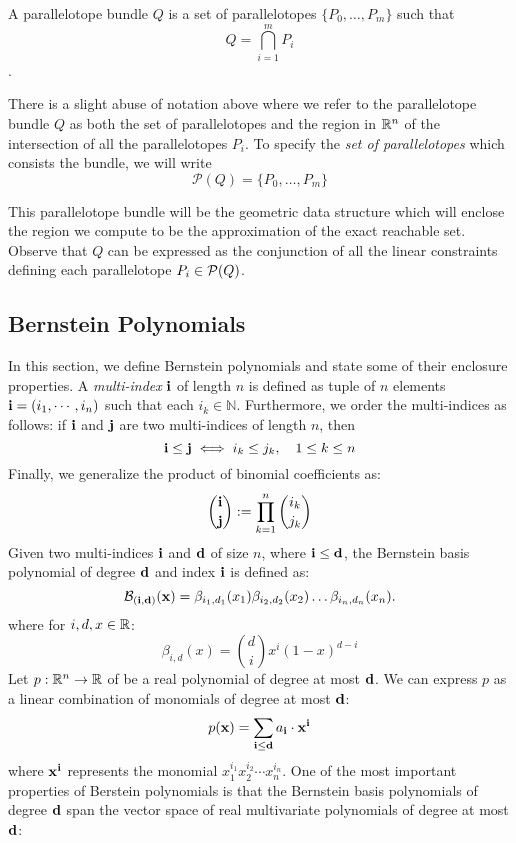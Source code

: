 %
%
\begin{definition}
A parallelotope bundle $Q$ is a set of parallelotopes $\{P_0, \ldots, P_m\}$ such that
  $$ Q = \bigcap_{i=1}^{m}P_i $$.
\end{definition}

\begin{remark}
There is a slight abuse of notation above where we refer to the parallelotope bundle $Q$ as both the set of parallelotopes and the region in ${\mathbb{R}}^n$ of the intersection of all the parallelotopes $P_i$. To specify the \emph{set of parallelotopes} which consists the bundle, we will write
$$
\mathcal{P}(Q) = \{P_0, \ldots, P_m\}
$$
\end{remark}

%
\noindent This parallelotope bundle will be the geometric data structure which will enclose the region we compute to be the approximation of the exact reachable set. Observe that $Q$ can be expressed as the conjunction of all the linear constraints defining each parallelotope $P_i \in \mathcal{P}(Q)$.

\subsection{Bernstein Polynomials}
\label{sec:bernstein}
In this section, we define Bernstein polynomials and state some of their enclosure properties. A \emph{multi-index} ${\bf i}$ of length $n$ is defined as tuple of $n$ elements ${\bf i} = (i_1,\cdots, i_n)$ such that each $i_k \in \mathbb{N}$. Furthermore, we order the multi-indices as follows: if ${\bf i}$ and ${\bf j}$ are two multi-indices of length $n$, then
\[
  {\bf i} \leq {\bf j} \iff i_k \leq j_k, \quad 1 \leq  k \leq n
\]
Finally, we generalize the product of binomial coefficients as:
\[
  \binom{{\bf i}}{{\bf j}} := \prod_{k=1}^n \binom{i_k}{j_k}
\]
%
Given two multi-indices ${\bf i}$ and ${\bf d}$ of size $n$, where ${\bf i} \leq {\bf d}$, the Bernstein basis polynomial of degree ${\bf d}$ and index ${\bf i}$ is defined as:
\begin{equation}
\label{eq:bernstein_basis_poly}
\mathcal{B}_{({\bf i},{\bf d})}({\bf x}) = \beta_{i_1,d_1}(x_1) \beta_{i_2,d_2}(x_2)\ldots \beta_{i_n,d_n}(x_n).
\end{equation}
%
where for $i,d,x \in {\mathbb{R}}$:
%
\begin{equation}
\beta_{i,d}(x) = \binom{d}{i}x^{i}(1-x)^{d - i}
\end{equation}
%
Let $p: {\mathbb{R}}^n \rightarrow {\mathbb{R}}$ of be a real polynomial of degree at most ${\bf d}$. We can express $p$ as a linear combination of monomials of degree at most ${\bf d}$:
\[
p({\bf x}) = \sum_{{\bf i} \leq {\bf d}} a_{\bf i} \cdot {\bf x}^{\bf i}
\]
where ${\bf x}^{\bf i}$ represents the monomial $x_1^{i_1}x_2^{i_2}\cdots x_n^{i_n}$. One of the most important properties of Berstein polynomials is that the Bernstein basis polynomials of degree ${\bf d}$ span the vector space of real multivariate polynomials of degree at most ${\bf d}$:

